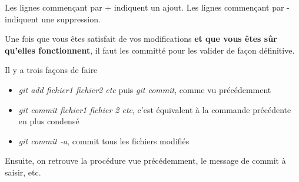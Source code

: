\documentclass[a4paper]{article}
\begin{document}
Les lignes commençant par + indiquent un ajout. Les lignes commençant par - indiquent une suppression.

Une fois que vous êtes satisfait de vos modifications \textbf{et que vous êtes sûr qu'elles fonctionnent}, il faut les committé pour les valider de façon définitive.

Il y a trois façons de faire

\begin{itemize}
\item \emph{git add fichier1 fichier2 etc} puis \emph{git commit}, comme vu précédemment 
\item \emph{git commit fichier1 fichier 2 etc}, c'est équivalent à la commande précédente en plus condensé
\item \emph{git commit -a}, commit tous les fichiers modifiés
\end{itemize}

Ensuite, on retrouve la procédure vue précédemment, le message de commit à saisir, etc.
\end{document}
